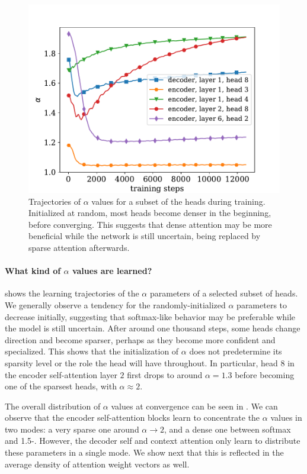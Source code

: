 \begin{figure}[ht]
    \centering
    \includegraphics[width=0.95\columnwidth]{Figures/learning_alpha.pdf}
    \caption{\label{fig:learning_alpha}
        Trajectories of $\alpha$ values for a subset of the heads during
        training. Initialized at random, most heads become denser in the
        beginning, before converging. This suggests that dense attention may
        be more beneficial while the network is still uncertain, being
        replaced by sparse attention afterwards.}
\end{figure}

\paragraph*{What kind of {\boldmath $\alpha$} values are learned?}
 shows the learning trajectories of the
$\alpha$ parameters of a selected subset of heads. We generally
observe a tendency for the randomly-initialized $\alpha$ parameters
to decrease initially, suggesting that softmax-like behavior may be
preferable while the model is still uncertain. After around one
thousand steps, some heads change direction and become sparser,
perhaps as they become more confident and specialized. This shows
that the initialization of $\alpha$ does not predetermine its
sparsity level or the role the head will have throughout. In
particular, head $8$ in the encoder self-attention layer $2$ first
drops to around $\alpha=1.3$ before becoming one of the sparsest
heads, with $\alpha\approx2$.

The overall distribution of $\alpha$ values at convergence can be
seen in . We can observe that the encoder
self-attention blocks learn to concentrate the $\alpha$ values in two
modes: a very sparse one around $\alpha \rightarrow 2$, and a dense
one between softmax and 1.5-\entmaxtext{}. However, the decoder self
and context attention only learn to distribute these parameters in a
single mode. We show next that this is reflected in the average
density of attention weight vectors as well.

